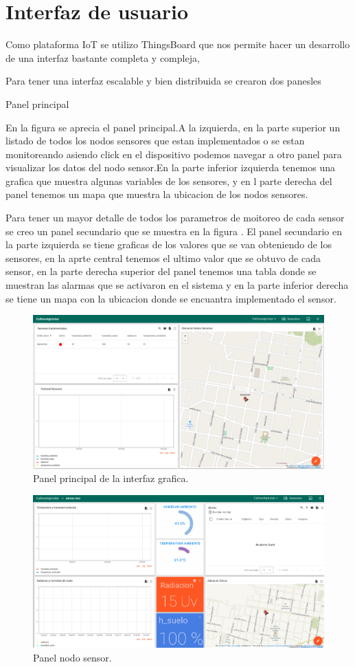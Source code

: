 \section{Interfaz de usuario}

Como plataforma IoT se utilizo ThingsBoard que nos permite hacer un desarrollo de una interfaz bastante completa y compleja, 

Para tener una interfaz escalable y bien distribuida se crearon dos panesles 

Panel principal 

En la figura se aprecia el panel principal.A la izquierda, en la parte superior un listado de todos los nodos sensores que estan implementados o se estan monitoreando asiendo click en el dispositivo podemos navegar a otro panel para visualizar los datos del nodo sensor.En la parte inferior izquierda tenemos una grafica que muestra algunas variables de los sensores,
y en l parte derecha del panel tenemos un mapa que muestra la ubicacion de los nodos sensores.


Para tener un mayor detalle de todos los parametros de moitoreo de cada sensor se creo un panel secundario que se muestra en la figura .
El panel secundario en la parte izquierda se tiene graficas de los valores que se van obteniendo de los sensores, en la aprte central tenemos el ultimo valor que se obtuvo de cada sensor, en la parte derecha superior del panel tenemos una tabla donde se muestran las alarmas que se activaron en el sistema y en la parte inferior derecha se tiene un mapa con la ubicacion donde se encuantra implementado el sensor.  
\begin{figure}[htbp]
  \centering
	\includegraphics[width=\textwidth]{./Figures/panel_principal.png}
  \caption{Panel principal de la interfaz grafica.}
	\label{fig:Panel principal}
\end{figure}

\begin{figure}[htbp]
  \centering
	\includegraphics[width=\textwidth]{./Figures/panel_nodosensor.png}
  \caption{Panel nodo sensor.}
	\label{fig:Panel nodo sensor}
\end{figure}